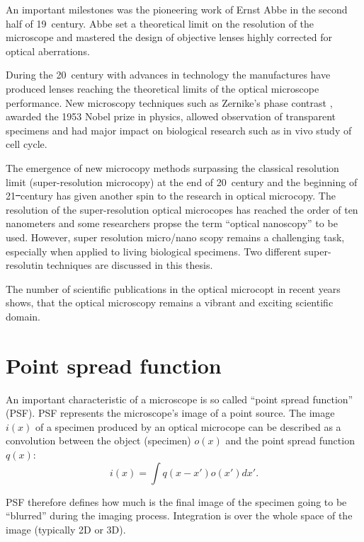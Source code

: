An important milestones was the pioneering work of Ernst Abbe \cite{Abbe1873} in the second half of 19\ths\ century. Abbe set a theoretical limit on the resolution of the microscope and mastered the design of objective lenses highly corrected for optical aberrations.

During the 20\ths\ century with advances in technology the manufactures have produced lenses reaching the theoretical limits of the optical microscope performance. New microscopy techniques such as Zernike's phase contrast \cite{Zernike1942}, awarded the 1953 Nobel prize in physics, allowed observation of transparent specimens and had major impact on biological research such as in vivo study of cell cycle. 

The emergence of new microcopy methods surpassing the classical resolution limit (super-resolution microcopy) at the end of 20\ths\ century and the beginning of 21\st\ century has given another spin to the research in optical microcopy. The resolution of the super-resolution optical microcopes has reached the order of ten nanometers and some researchers propse the term ``optical nanoscopy'' to be used. However, super resolution micro/nano scopy remains a challenging task, especially when applied to living biological specimens. Two different super-resolutin techniques are discussed in this thesis. 

The number of scientific publications in the optical microcopt in recent years shows, that the optical microscopy remains a vibrant and exciting scientific domain.


\section{Point spread function}

An important characteristic of a microscope is so called ``point spread function'' (PSF). PSF represents the microscope's image of a point source. The image $i(x)$ of a specimen produced by an optical microcope can be described as a convolution between the object (specimen) $o(x)$ and the point spread function $q(x)$:
%
\begin{equation}
	i(x)=\int q(x-x')o(x')dx'.
\end{equation}  

PSF therefore defines how much is the final image of the specimen going to be ``blurred'' during the imaging process. Integration is over the whole space of the image (typically 2D or 3D). 

